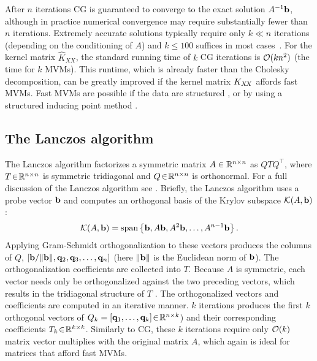 After $n$ iterations CG is guaranteed to converge to the exact solution $A^{-1} \mathbf{b}$, although in practice numerical convergence may require substantially fewer than $n$ iterations.
Extremely accurate solutions typically require only $k \ll n$ iterations (depending on the conditioning of $A$) and $k\leq 100$ suffices in most cases~\cite{golub2012matrix}.
For the kernel matrix $\widehat K_{X \! X}$, the standard running time of $k$ CG iterations is $\bigo{k n^2}$ (the time for $k$ MVMs).
This runtime, which is already faster than the Cholesky decomposition, can be greatly improved if the kernel matrix $K_{X\!X}$ affords fast MVMs.
Fast MVMs are possible if the data are structured \cite{cunningham2008fast,saatcci2012scalable}, or by using a structured inducing point method \cite{wilson2015kernel}.

\subsection{The Lanczos algorithm}
\label{subsec:lanczos}
The Lanczos algorithm factorizes a symmetric matrix $A \in \mathbb{R}^{n \times n}$ as $QTQ^\top$, where $T \! \in \! \mathbb{R}^{n \times n}$ is symmetric tridiagonal and $Q \! \in \! \mathbb{R}^{n \times n}$ is orthonormal. For a full discussion of the Lanczos algorithm see \citet{golub2012matrix}.
Briefly, the Lanczos algorithm uses a probe vector $\mathbf{b}$ and computes an orthogonal basis of the Krylov subspace $\mathcal{K} (A, \mathbf{b})$:
%
\[
  \mathcal{K}(A,\mathbf{b}) = \text{span}\left\{ \mathbf{b}, A \mathbf{b}, A^2 \mathbf{b}, \ldots, A^{n-1} \mathbf{b} \right\}.
\]
%
Applying Gram-Schmidt orthogonalization to these vectors produces the columns of $Q$, $\left[ {\mathbf{b}}/{\Vert \mathbf{b} \Vert}, \mathbf{q}_2, \mathbf{q}_3, \ldots, \mathbf{q}_n \right]$ (here $\Vert \mathbf{b} \Vert$ is the Euclidean norm of $\mathbf{b}$).
The orthogonalization coefficients are collected into $T$.
Because $A$ is symmetric, each vector needs only be orthogonalized against the two preceding vectors, which results in the tridiagonal structure of $T$ \cite{golub2012matrix}.
The orthogonalized vectors and coefficients are computed in an iterative manner.
$k$ iterations produces the first $k$ orthogonal vectors of $Q_k = \left[ \mathbf{q}_1, \ldots, \mathbf{q}_k \right] \! \in \! \mathbb{R}^{n \times k}$)
and their corresponding coefficients $T_k \! \in \! \mathbb{R}^{k \times k}$.
Similarly to CG, these $k$ iterations require only $\bigo{k}$ matrix vector multiplies with the original matrix $A$, which again is ideal for matrices that afford fast MVMs.

